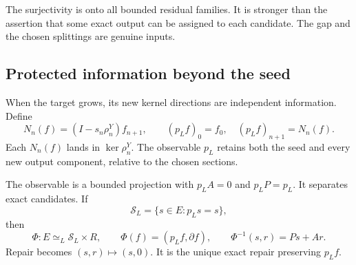 The surjectivity is onto all bounded residual families. It is stronger than the assertion that some exact output can be assigned to each candidate. The gap and the chosen splittings are genuine inputs.

\subsection{Protected information beyond the seed}
When the target grows, its new kernel directions are independent information. Define
\[
 N_n(f)=(I-s_n\rho^Y_n)f_{n+1},\qquad
 (p_Lf)_0=f_0,\quad(p_Lf)_{n+1}=N_n(f).
\]
Each \(N_n(f)\) lands in \(\ker\rho^Y_n\). The observable \(p_L\) retains both the seed and every new output component, relative to the chosen sections.

\begin{theorem}\label{KS21}
The observable is a bounded projection with \(p_LA=0\) and \(p_LP=p_L\). It separates exact candidates. If
\[
 \mathcal S_L=\{s\in E:p_Ls=s\},
\]
then
\[
 \Phi:E\simeq_L\mathcal S_L\times R,
 \qquad \Phi(f)=(p_Lf,\partial f),
 \qquad \Phi^{-1}(s,r)=Ps+Ar.
\]
Repair becomes \((s,r)\mapsto(s,0)\). It is the unique exact repair preserving \(p_Lf\).
\end{theorem}
